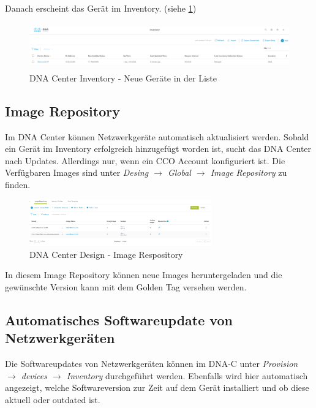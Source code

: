 Danach erscheint das Gerät im Inventory. (siehe \ref{fig:dna-center-inventory-index-new})

\begin{figure}[H]
	\centering
	\includegraphics[height=2cm]{img/dna-center-inventory-index-new.png}
	\caption{DNA Center Inventory - Neue Geräte in der Liste}
	\label{fig:dna-center-inventory-index-new}
\end{figure}


\subsection{Image Repository}
Im DNA Center können Netzwerkgeräte automatisch aktualisiert werden. Sobald ein Gerät im Inventory erfolgreich hinzugefügt worden ist, sucht das DNA Center nach Updates. Allerdings nur, wenn ein CCO Account konfiguriert ist. Die Verfügbaren Images sind unter \textit{Desing $\rightarrow$ Global $\rightarrow$ Image Repository} zu finden.

\begin{figure}[H]
	\centering
	\includegraphics[height=2cm]{img/dna-center-design-image-repository.png}
	\caption{DNA Center Design - Image Respository}
	\label{fig:dna-center-design-image-repository}
\end{figure}

In diesem Image Repository können neue Images heruntergeladen und die gewünschte Version kann mit dem Golden Tag versehen werden. 

\subsection{Automatisches Softwareupdate von Netzwerkgeräten}
Die Softwareupdates von Netzwerkgeräten können im DNA-C unter \textit{Provision $\rightarrow$ devices $\rightarrow$ Inventory} durchgeführt werden. Ebenfalls wird hier automatisch angezeigt, welche Softwareversion zur Zeit auf dem Gerät installiert und ob diese aktuell oder outdated ist.

